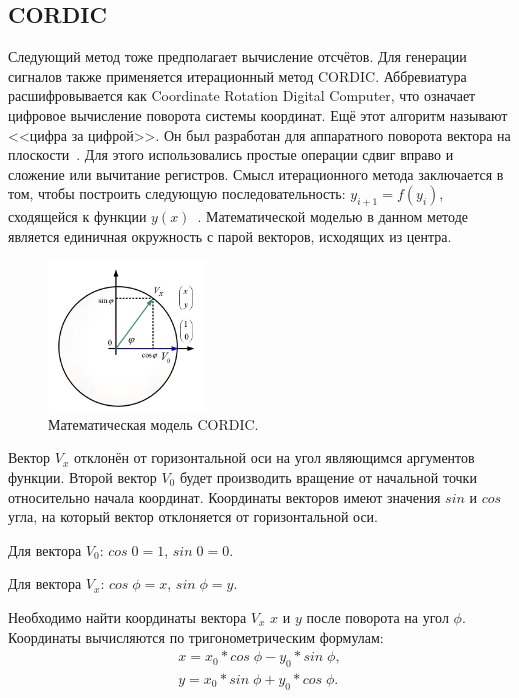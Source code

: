 \subsection{CORDIC}
	Следующий метод тоже предполагает вычисление отсчётов. Для генерации сигналов также применяется итерационный метод CORDIC. 
	Аббревиатура расшифровывается как Coordinate Rotation Digital Computer, что означает цифровое вычисление поворота системы координат. Ещё этот алгоритм называют <<цифра за цифрой>>. Он был разработан для аппаратного поворота вектора на плоскости~\cite{dds_en}. Для этого использовались простые операции сдвиг вправо и сложение или вычитание регистров.
	Смысл итерационного метода заключается в том, чтобы построить следующую последовательность: $y_{i+1}=f(y_{i})$, сходящейся к функции $y(x)$~\cite{cordic}. Математической моделью в данном методе является единичная окружность с парой векторов, исходящих из центра.
	
	\begin{figure}[H]
    \centering
    \includegraphics[width=0.375\textwidth]{../image/cordic.png}
    \caption{Математическая модель CORDIC.}
	\end{figure}

	Вектор $V_{x}$ отклонён от горизонтальной оси на угол являющимся аргументов функции. Второй вектор $V_{0}$ будет производить вращение от начальной точки относительно начала координат. Координаты векторов имеют значения $sin$ и $cos$ угла, на который вектор отклоняется от горизонтальной оси. 

	Для вектора $V_{0}$: $cos\;0 = 1$, $sin\;0 = 0$. 

	Для вектора $V_{x}$: $cos\;\phi = x$, $sin\;\phi = y$.

	Необходимо найти координаты вектора $V_{x}$ $x$ и $y$ после поворота на угол $\phi$. Координаты вычисляются по тригонометрическим формулам:
	\begin{gather}
	x=x_{0}*cos\;\phi-y_{0}*sin\;\phi, \\
	y=x_{0}*sin\;\phi+y_{0}*cos\;\phi. 
	\end{gather}
	
